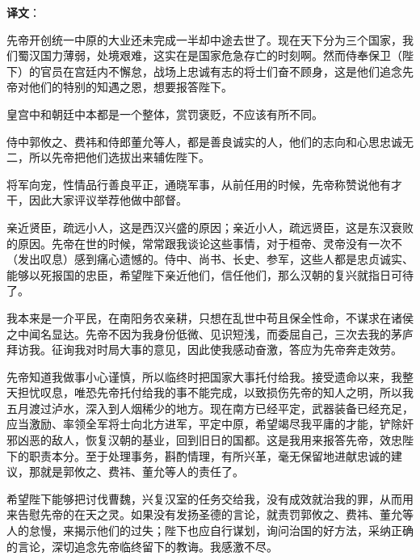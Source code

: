 \documentclass[12pt,UTF-8,openany]{ctexbook}
\begin{document}
\newpage

\textbf{译文}：

\vspace{1em}

\begin{normalsize}
    
    先帝开创统一中原的大业还未完成一半却中途去世了。现在天下分为三个国家，我们蜀汉国力薄弱，处境艰难，这实在是国家危急存亡的时刻啊。然而侍奉保卫（陛下）的官员在宫廷内不懈怠，战场上忠诚有志的将士们奋不顾身，这是他们追念先帝对他们的特别的知遇之恩，想要报答陛下。
    
    皇宫中和朝廷中本都是一个整体，赏罚褒贬，不应该有所不同。
    
    侍中郭攸之、费祎和侍郎董允等人，都是善良诚实的人，他们的志向和心思忠诚无二，所以先帝把他们选拔出来辅佐陛下。
    
    将军向宠，性情品行善良平正，通晓军事，从前任用的时候，先帝称赞说他有才干，因此大家评议举荐他做中部督。
    
    亲近贤臣，疏远小人，这是西汉兴盛的原因；亲近小人，疏远贤臣，这是东汉衰败的原因。先帝在世的时候，常常跟我谈论这些事情，对于桓帝、灵帝没有一次不（发出叹息）感到痛心遗憾的。侍中、尚书、长史、参军，这些人都是忠贞诚实、能够以死报国的忠臣，希望陛下亲近他们，信任他们，那么汉朝的复兴就指日可待了。
    
    我本来是一介平民，在南阳务农亲耕，只想在乱世中苟且保全性命，不谋求在诸侯之中闻名显达。先帝不因为我身份低微、见识短浅，而委屈自己，三次去我的茅庐拜访我。征询我对时局大事的意见，因此使我感动奋激，答应为先帝奔走效劳。
    
    先帝知道我做事小心谨慎，所以临终时把国家大事托付给我。接受遗命以来，我整天担忧叹息，唯恐先帝托付给我的事不能完成，以致损伤先帝的知人之明，所以我五月渡过泸水，深入到人烟稀少的地方。现在南方已经平定，武器装备已经充足，应当激励、率领全军将士向北方进军，平定中原，希望竭尽我平庸的才能，铲除奸邪凶恶的敌人，恢复汉朝的基业，回到旧日的国都。这是我用来报答先帝，效忠陛下的职责本分。至于处理事务，斟酌情理，有所兴革，毫无保留地进献忠诚的建议，那就是郭攸之、费祎、董允等人的责任了。
    
    希望陛下能够把讨伐曹魏，兴复汉室的任务交给我，没有成效就治我的罪，从而用来告慰先帝的在天之灵。如果没有发扬圣德的言论，就责罚郭攸之、费祎、董允等人的怠慢，来揭示他们的过失；陛下也应自行谋划，询问治国的好方法，采纳正确的言论，深切追念先帝临终留下的教诲。我感激不尽。
    
    
    
\end{normalsize}
\end{document}

